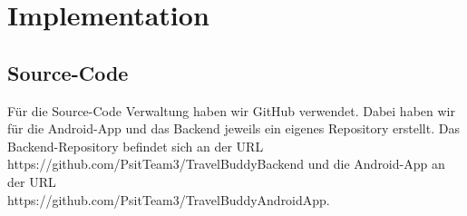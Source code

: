 \section{Implementation}
\subsection{Source-Code}\label{sourcecode}
Für die Source-Code Verwaltung haben wir GitHub verwendet.
Dabei haben wir für die Android-App und das Backend jeweils ein eigenes Repository erstellt.
Das Backend-Repository befindet sich an der URL \\
https://github.com/PsitTeam3/TravelBuddyBackend
und die Android-App an der URL \\
https://github.com/PsitTeam3/TravelBuddyAndroidApp.
